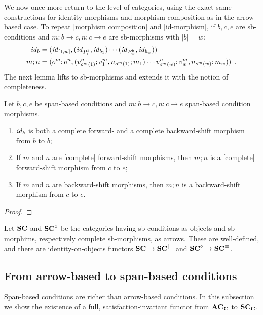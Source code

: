 %
We now once more return to the level of categories, using the exact same constructions for identity morphisms and morphism composition as in the arrow-based case. To repeat \eqref{morphism composition} and \eqref{id-morphism}, if $b,c,e$ are sb-conditions and $m:b\to c,n:c\to e$ are sb-morphisms with $|b|=w$:
%
\begin{align*}
\mathit{id}_b & = (\mathit{id}_{[1,w]},(\mathit{id}_{P^b_1},\mathit{id}_{b_1})\cdots (\mathit{id}_{P^b_w},\mathit{id}_{b_w})) \\
m;n & = (o^m;o^n,(v^n_{o^m(1)};v^m_1,n_{o^m(1)};m_1)\cdots v^n_{o^m(w)};v^m_w,n_{o^m(w)};m_w)) \enspace.
\end{align*}
%
The next lemma lifts  to sb-morphisms and extends it with the notion of completeness.

\begin{lemma}
Let $b,c,e$ be span-based conditions and $m:b\to c,n:c\to e$ span-based condition morphisms.
\begin{enumerate}[topsep=\smallskipamount]
\item $\mathit{id}_b$ is both a complete forward- and a complete backward-shift morphism from $b$ to $b$;
\item If $m$ and $n$ are [complete] forward-shift morphisms, then $m;n$ is a [complete] forward-shift morphism from $c$ to $e$;
\item If $m$ and $n$ are backward-shift morphisms, then $m;n$ is a backward-shift morphism from $c$ to $e$.
\end{enumerate}
\end{lemma}

\begin{proof}
\end{proof}


\begin{theorem} 
Let $\mathbf{SC}$ and $\mathbf{SC}^\circ$ be the categories having sb-conditions as objects and sb-morphims, respectively complete sb-morphisms, as arrows. These are well-defined, and there are identity-on-objects functors $\mathbf{SC} \to \mathbf{SC}^{\models}$ and $\mathbf{SC}^\circ \to \mathbf{SC}^{\equiv}$.
\end{theorem}

\subsection{From arrow-based to span-based conditions}

Span-based conditions are richer than arrow-based conditions. In this subsection we show the existence of a full, satisfaction-invariant functor from $\mathbf{AC}_{\mathbf{C}}$ to $\mathbf{SC}_{\mathbf{C}}$.


